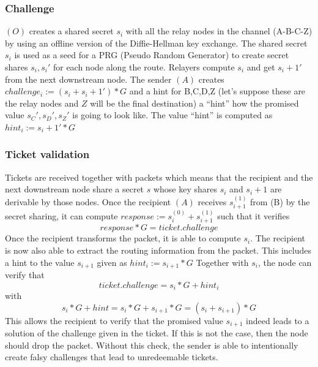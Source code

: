 \subsubsection*{Challenge}
$(O)$ creates a shared secret $s_i$ with all the relay nodes in the channel (A-B-C-Z) by using an offline version of the Diffie-Hellman key exchange.
\newline The shared secret $s_i$ is used as a seed for a PRG (Pseudo Random Generator) to create secret shares $s_i,s_i'$ for each node along the route. 
Relayers compute $s_i$ and get $s_i+1'$ from the next downstream node. 
\newline The sender $(A)$ creates $challenge_i:=(s_i+s_i+1')*G$ and a hint for B,C,D,Z (let’s suppose these are the relay nodes and $Z$ will be the final destination) a “hint” how the promised value $s_C',s_D',s_Z'$ is going to look like. 
The value “hint” is computed as $hint_i:=s_i+1'*G$ 


\subsubsection{Ticket validation}
Tickets are received together with packets which means that the recipient and the next downstream node share a secret $s$ whose key shares $s_i$ and $s_i+1$ are derivable by those nodes.
\newline Once the recipient $(A)$ receives $s_{i+1}^{(1)}$ from (B) by the secret sharing, it can compute $response:=s_i^{(0)}+s_{i+1}^{(1)}$ such that it verifies  
$$response*G=ticket.challenge$$
Once the recipient transforms the packet, it is able to compute $s_i$. The recipient is now also able to extract the routing information from the packet. 
This includes a hint to the value $s_{i+1}$ given as $hint_i:=s_{i+1}*G$ 
\newline Together with $s_i$, the node can verify that $$ticket.challenge=s_i*G+hint_i$$ with $$s_i*G+hint=s_i*G+s_{i+1}*G=(s_i+s_{i+1})*G$$ 
This allows the recipient to verify that the promised value $s_{i+1}$ indeed leads to a solution of the challenge given in the ticket. 
If this is not the case, then the node should drop the packet.
\newline Without this check, the sender is able to intentionally create falsy challenges that lead to unredeemable tickets.


